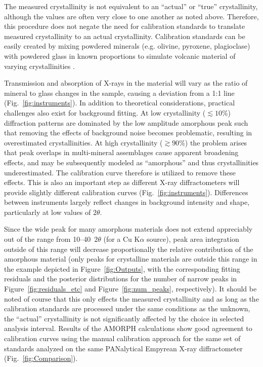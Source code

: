 \documentclass[review]{elsarticle}
\newcommand{\changed}{\color{blue}}
\begin{document}
{\changed The measured crystallinity is not equivalent to an ``actual'' or ``true'' crystallinity, although the values are often very close to one another as noted above.
Therefore,} this procedure does not negate the need for calibration standards
to translate measured crystallinity to an actual crystallinity.
{\changed Calibration standards can be easily created by mixing
powdered minerals (e.g. olivine, pyroxene, plagioclase) with powdered glass in known
proportions to simulate volcanic material of varying crystallinities \citep[e.g.,][]{rowe2012, wall2014}.} 

Transmission and absorption of X-rays in the material will vary as the ratio of mineral to glass changes in the sample, causing a deviation from a 1:1 line (Fig.~\ref{fig:instruments}). In addition to theoretical considerations, practical challenges also exist for background fitting. At low crystallinity ($\lesssim 10\%$) diffraction patterns are dominated by the low amplitude amorphous peak such that removing the effects of background noise becomes problematic, resulting in overestimated crystallinities. At high crystallinity ($\gtrsim 90\%$) the problem arises that peak overlaps in multi-mineral assemblages cause {\changed apparent} broadening effects, and may be subsequently modeled as ``amorphous'' and thus crystallinities  underestimated. The calibration curve therefore is utilized to remove these effects. This is also an important step as
different X-ray diffractometers will provide slightly different calibration curves (Fig.~\ref{fig:instruments}).
Differences between instruments largely reflect changes in background intensity and shape,
particularly at low values of $2\theta$. 

	
{\changed Since the wide peak for many} amorphous materials does not extend
appreciably out of the range from 10--40\degree~$2\theta$ (for a Cu K$\alpha$ source), peak {\changed area} integration
outside of this range will decrease {\changed proportionally} the relative contribution of the amorphous material
(only peaks for crystalline materials are outside this range {\changed in the example depicted in Figure~\ref{fig:Outputs}, with the corresponding fitting residuals and the posterior distributions
for the number of narrow peaks in Figure~\ref{fig:residuals_etc} and Figure~\ref{fig:num_peaks}, respectively).
It should be noted of course that this only effects the measured crystallinity and as long as the calibration standards are processed under the same conditions as the unknown, the ``actual'' crystallinity is not significantly affected by the choice in selected analysis interval. Results of the AMORPH calculations show good agreement to calibration curves using the manual
calibration approach for the same set of standards analyzed on the same PANalytical Empyrean X-ray diffractometer (Fig.~\ref{fig:Comparison}).}
\end{document}
